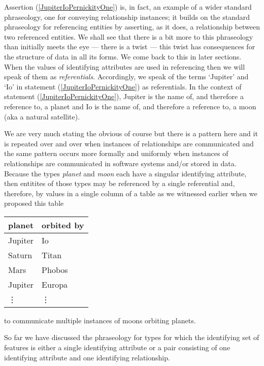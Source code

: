 Assertion (\ref{JupiterIoPernickityOne}) is, in fact, an example of a wider standard phraseology, one  for conveying relationship instances;
it builds on the standard phraseology for referencing entities
by asserting, as it does,  a relationship between two referenced entities.
We shall see that there is a bit more to this phraseology than initially meets the eye --- there is a twist --- this twist has consequences for the structure of data in all its forms. We come back to this in later sections.
\mynote
When the values of identifying attributes are used in referencing 
then we will speak of them as \textit{referentials}. 
Accordingly, we speak of the terms `Jupiter' and `Io' in statement (\ref{JupiterIoPernickityOne}) as referentials.
In the context of statement (\ref{JupiterIoPernickityOne}), Jupiter is the name of, and therefore  a reference to, a planet and  Io is the name of, and therefore a reference to, a moon (aka a natural satellite).
 
\mynote
We are very much stating the obvious of course but there is a pattern here and it is repeated over and over when instances of relationships are communicated  and the same pattern occurs more formally  and uniformly when instances of relationships are communicated in software systems and/or stored in data.
Because 
the types \textit{planet} and \textit{moon} each have
a singular identifying attribute, then entitites of those types 
may be referenced by a single referential and, therefore, by values in a
single column of a table as we witnessed earlier when we proposed this table
\begin{center}
\begin{tabular}{|l | l|}
\hline
planet & orbited by \\
\hline\hline
Jupiter  & Io \\
\hline
Saturn   & Titan    \\
\hline
Mars     & Phobos    \\
\hline
Jupiter  & Europa         \\
\hline
\vdots    & \vdots  \\
\hline
\end{tabular}
\end{center}
to communicate multiple instances of moons orbiting planets.

\mynote
So far we have discussed the phraseology for  types for which the identifying set of features is either a single identifying attribute or a pair consisting of one identifying attribute and one identifying relationship. 


